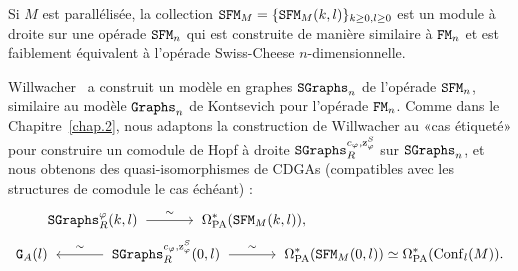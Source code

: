 Si $M$ est parallélisée, la collection $\mathtt{SFM}_{M} = \{ \mathtt{SFM}_{M}(k,l) \}_{k \geq 0, l \geq 0}$ est un module à droite sur une opérade $\mathtt{SFM}_{n}$ qui est construite de manière similaire à $\mathtt{FM}_{n}$ et est faiblement équivalent à l'opérade Swiss-Cheese $n$-dimensionnelle.

Willwacher~\cite{Willwacher2015a} a construit un modèle en graphes $\mathtt{SGraphs}_{n}$ de l'opérade $\mathtt{SFM}_{n}$, similaire au modèle $\mathtt{Graphs}_{n}$ de Kontsevich pour l'opérade $\mathtt{FM}_{n}$.
Comme dans le Chapitre~\ref{chap.2}, nous adaptons la construction de Willwacher au «cas étiqueté» pour construire un comodule de Hopf à droite $\mathtt{SGraphs}^{c_{\varphi},\mathrm{z}^{S}_{\varphi}}_{R}$ sur $\mathtt{SGraphs}_{n}$, et nous obtenons des quasi-isomorphismes de CDGAs (compatibles avec les structures de comodule le cas échéant) :
\begin{align*}
  {} & \SGraphs^{\varphi}_{R}(k,l) \qiso \OmPA^{*}(\SFM_{M}(k,l)), \\
  \GG{A}(l) & \qiso* \SGraphs^{c_{\varphi},\szphi}_{R}(0,l) \qiso \OmPA^{*}(\SFM_{M}(0,l)) \simeq \OmPA^{*}(\Conf_{l}(M)).
\end{align*}

